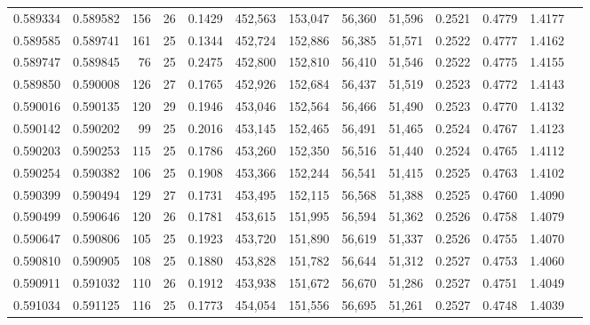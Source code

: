 \begin{tabular}{rrrrrrrrrrrrr}
0.589334 & 0.589582 &   156 &  26 &                                     0.1429 & 452,563 & 153,047 &  56,360 &  51,596 & 0.2521 & 0.4779 & 1.4177 \\
0.589585 & 0.589741 &   161 &  25 &                                     0.1344 & 452,724 & 152,886 &  56,385 &  51,571 & 0.2522 & 0.4777 & 1.4162 \\
0.589747 & 0.589845 &    76 &  25 &                                     0.2475 & 452,800 & 152,810 &  56,410 &  51,546 & 0.2522 & 0.4775 & 1.4155 \\
0.589850 & 0.590008 &   126 &  27 &                                     0.1765 & 452,926 & 152,684 &  56,437 &  51,519 & 0.2523 & 0.4772 & 1.4143 \\
0.590016 & 0.590135 &   120 &  29 &                                     0.1946 & 453,046 & 152,564 &  56,466 &  51,490 & 0.2523 & 0.4770 & 1.4132 \\
0.590142 & 0.590202 &    99 &  25 &                                     0.2016 & 453,145 & 152,465 &  56,491 &  51,465 & 0.2524 & 0.4767 & 1.4123 \\
0.590203 & 0.590253 &   115 &  25 &                                     0.1786 & 453,260 & 152,350 &  56,516 &  51,440 & 0.2524 & 0.4765 & 1.4112 \\
0.590254 & 0.590382 &   106 &  25 &                                     0.1908 & 453,366 & 152,244 &  56,541 &  51,415 & 0.2525 & 0.4763 & 1.4102 \\
0.590399 & 0.590494 &   129 &  27 &                                     0.1731 & 453,495 & 152,115 &  56,568 &  51,388 & 0.2525 & 0.4760 & 1.4090 \\
0.590499 & 0.590646 &   120 &  26 &                                     0.1781 & 453,615 & 151,995 &  56,594 &  51,362 & 0.2526 & 0.4758 & 1.4079 \\
0.590647 & 0.590806 &   105 &  25 &                                     0.1923 & 453,720 & 151,890 &  56,619 &  51,337 & 0.2526 & 0.4755 & 1.4070 \\
0.590810 & 0.590905 &   108 &  25 &                                     0.1880 & 453,828 & 151,782 &  56,644 &  51,312 & 0.2527 & 0.4753 & 1.4060 \\
0.590911 & 0.591032 &   110 &  26 &                                     0.1912 & 453,938 & 151,672 &  56,670 &  51,286 & 0.2527 & 0.4751 & 1.4049 \\
0.591034 & 0.591125 &   116 &  25 &                                     0.1773 & 454,054 & 151,556 &  56,695 &  51,261 & 0.2527 & 0.4748 & 1.4039 \\

\end{tabular}
